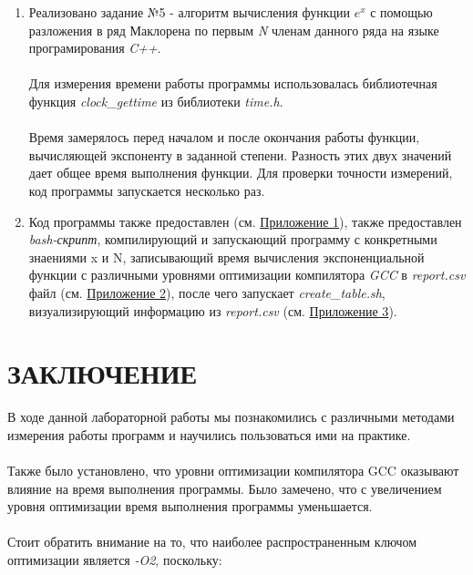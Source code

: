 \documentclass[12pt,a4paper]{article}
\numberwithin{subsection}{section}
\begin{document}
\begin{enumerate}
    \item Реализовано задание №5 - алгоритм вычисления функции $e^x$ с помощью разложения 
    в ряд Маклорена по первым \textit{N} членам данного ряда на языке програмирования \textit{C++}.
    \\
    \\
    Для измерения времени работы программы использовалась библиотечная 
    функция \textit{clock\_gettime} из библиотеки \textit{time.h}.
    \\
    \\
    Время замерялось перед началом и после окончания работы функции, вычисляющей
    экспоненту в заданной степени. Разность этих двух значений дает общее время выполнения функции. 
    Для проверки точности измерений, код программы запускается несколько раз.

    \item Код программы также предоставлен (см. \hyperref[app:listing]{Приложение 1}), 
    также предоставлен \textit{bash-скрипт}, компилирующий и запускающий программу 
    с конкретными знаениями x и N, записывающий время вычисления экспоненциальной функции с 
    различными уровнями оптимизации компилятора \textit{GCC} в \textit{report.csv} 
    файл (см. \hyperref[app:listing]{Приложение 2}), после чего запускает
    \textit{create\_table.sh}, визуализирующий информацию из 
    \textit{report.csv} (см. \hyperref[app:listing]{Приложение 3}).

\end{enumerate}


\section{ЗАКЛЮЧЕНИЕ}
В ходе данной лабораторной работы мы познакомились с различными методами измерения 
работы программ и научились пользоваться ими на практике.
\\
\\
Также было установлено, что уровни оптимизации компилятора GCC оказывают влияние
на время выполнения программы. Было замечено, что с увеличением уровня оптимизации
время выполнения программы уменьшается.
\\
\\
Стоит обратить внимание на то, что наиболее распространенным ключом оптимизации 
является \textit{-O2}, поскольку:
\end{document}

